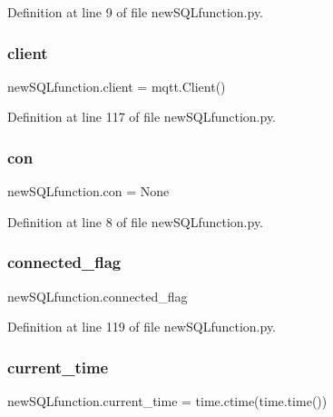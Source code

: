 Definition at line 9 of file new\+S\+Q\+Lfunction.\+py.

\mbox{\label{namespacenew_s_q_lfunction_a72483d3a9c8f0f84183ad8f1ff6179ba}} 
\subsubsection{client}
{\footnotesize\ttfamily new\+S\+Q\+Lfunction.\+client = mqtt.\+Client()}



Definition at line 117 of file new\+S\+Q\+Lfunction.\+py.

\mbox{\label{namespacenew_s_q_lfunction_aff12de9d9c9f4f2a1e7b0c25802f2b4e}} 
\subsubsection{con}
{\footnotesize\ttfamily new\+S\+Q\+Lfunction.\+con = None}



Definition at line 8 of file new\+S\+Q\+Lfunction.\+py.

\mbox{\label{namespacenew_s_q_lfunction_aa4a81804ce71009e658e235be88585b6}} 
\subsubsection{connected\+\_\+flag}
{\footnotesize\ttfamily new\+S\+Q\+Lfunction.\+connected\+\_\+flag}



Definition at line 119 of file new\+S\+Q\+Lfunction.\+py.

\mbox{\label{namespacenew_s_q_lfunction_adfa9bcad6f16b7e387b309e5474b4339}} 
\subsubsection{current\+\_\+time}
{\footnotesize\ttfamily new\+S\+Q\+Lfunction.\+current\+\_\+time = time.\+ctime(time.\+time())}



